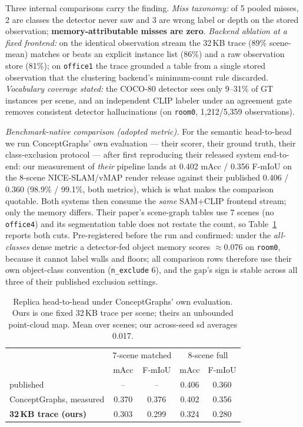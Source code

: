 \documentclass[conference]{IEEEtran}
\begin{document}
Three internal comparisons carry the finding. \emph{Miss taxonomy:} of 5
pooled misses, 2 are classes the detector never saw and 3 are wrong
label or depth on the stored observation; \textbf{memory-attributable
misses are zero}. \emph{Backend ablation at a fixed frontend:} on the
identical observation stream the 32\,KB trace (89\% scene-mean) matches
or beats an explicit instance list (86\%) and a raw observation store
(81\%); on \texttt{office1} the trace grounded a table from a single
stored observation that the clustering backend's minimum-count rule
discarded. \emph{Vocabulary coverage stated:} the COCO-80 detector sees
only 9--31\% of GT instances per scene, and an independent CLIP labeler
under an agreement gate removes consistent detector hallucinations (on
\texttt{room0}, 1{,}212/5{,}359 observations).

\emph{Benchmark-native comparison (adopted metric).} For the semantic
head-to-head we run ConceptGraphs' own evaluation --- their scorer,
their ground truth, their class-exclusion protocol --- after first
reproducing their released system end-to-end: our measurement of
\emph{their} pipeline lands at 0.402 mAcc / 0.356 F-mIoU on the 8-scene
NICE-SLAM/vMAP render release against their published 0.406 / 0.360
(98.9\% / 99.1\%, both metrics), which is what makes the comparison
quotable. Both systems then consume the \emph{same} SAM+CLIP frontend
stream; only the memory differs. Their paper's scene-graph tables use 7
scenes (no \texttt{office4}) and its segmentation table does not restate
the count, so Table~\ref{tab:replica} reports both cuts. Pre-registered
before the run and confirmed: under the \emph{all-classes} dense metric
a detector-fed object memory scores $\approx$0.076 on \texttt{room0},
because it cannot label walls and floors; all comparison rows therefore
use their own object-class convention (\texttt{n\_exclude} 6), and the
gap's sign is stable across all three of their published exclusion
settings.

\begin{table}[t]
\caption{Replica head-to-head under ConceptGraphs' own evaluation.
Ours is one fixed 32\,KB trace per scene; theirs an unbounded
point-cloud map. Mean over scenes; our across-seed sd averages 0.017.}
\label{tab:replica}
\centering
\small
\begin{tabular}{@{}lcccc@{}}
\toprule
 & \multicolumn{2}{c}{7-scene matched} & \multicolumn{2}{c}{8-scene full} \\
 & mAcc & F-mIoU & mAcc & F-mIoU \\
\midrule
published \cite{gu2024conceptgraphs} & -- & -- & 0.406 & 0.360 \\
ConceptGraphs, measured & 0.370 & 0.376 & 0.402 & 0.356 \\
\textbf{32\,KB trace (ours)} & 0.303 & 0.299 & 0.324 & 0.280 \\
\bottomrule
\end{tabular}
\end{table}
\end{document}
